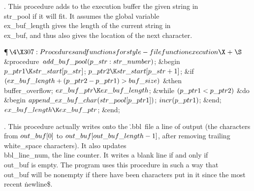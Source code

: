 .
This procedure adds to the execution buffer the given string in
\\{str\_pool} if it will fit.  It assumes the global variable
\\{ex\_buf\_length} gives the length of the current string in \\{ex\_buf},
and thus also gives the location of the next character.

\Y\P$\4\X307:Procedures and functions for style-file function execution\X%
\mathrel{+}\S$\6
\4\&{procedure}\1\  $\\{add\_buf\_pool}(\\{p\_str}:\\{str\_number})$;\2\6
\&{begin} $\\{p\_ptr1}\K\\{str\_start}[\\{p\_str}]$;\5
$\\{p\_ptr2}\K\\{str\_start}[\\{p\_str}+1]$;\6
\&{if} $(\\{ex\_buf\_length}+(\\{p\_ptr2}-\\{p\_ptr1})>\\{buf\_size})$ \1%
\&{then}\5
\\{buffer\_overflow};\2\6
$\\{ex\_buf\_ptr}\K\\{ex\_buf\_length}$;\6
\&{while} $(\\{p\_ptr1}<\\{p\_ptr2})$ \1\&{do}\6
\&{begin} \6
$\\{append\_ex\_buf\_char}(\\{str\_pool}[\\{p\_ptr1}])$;\5
$\\{incr}(\\{p\_ptr1})$;\6
\&{end};\2\6
$\\{ex\_buf\_length}\K\\{ex\_buf\_ptr}$;\6
\&{end};\par
\fi

.
This procedure actually writes onto the \.{.bbl}~file a line of output
(the characters from $\\{out\_buf}[0]$ to $\\{out\_buf}[\\{out\_buf%
\_length}-1]$,
after removing trailing \\{white\_space} characters).  It also updates
\\{bbl\_line\_num}, the line counter.  It writes a blank line if and only
if \\{out\_buf} is empty.  The program uses this procedure in such a way
that \\{out\_buf} will be nonempty if there have been characters put in
it since the most recent \.{newline\$}.

